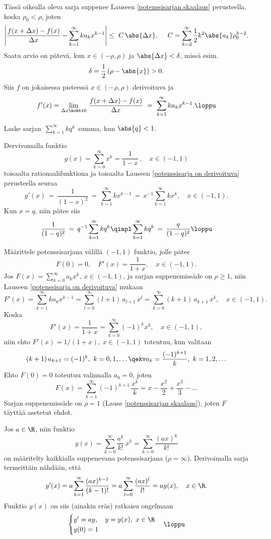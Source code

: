 Tässä oikealla oleva sarja suppenee Lauseen \ref{potenssisarjan skaalaus} perusteella, koska
$\rho_0<\rho$, joten
\[
\left|\frac{f(x+\Delta x)-f(x)}{\Delta x} - \sum_{k=1}^\infty ka_kx^{k-1}\right| 
       \le\ C\,\abs{\Delta x}, \quad\ C = \sum_{k=2}^\infty \frac{1}{2}k^2\abs{a_k}\rho_0^{k-2}.
\]
Saatu arvio on pätevä, kun $x \in (-\rho,\rho)$ ja $\abs{\Delta x} < \delta$, missä esim.\ 
\[ 
\delta = \frac{1}{2}\,(\rho-\abs{x}) > 0. 
\]
Siis $f$ on jokaisessa pisteessä $x \in (-\rho,\rho)$ derivoituva ja
\[
f'(x) = \lim_{\Delta x \kohti 0}\,\frac{f(x+\Delta x)-f(x)}{\Delta x}\ 
      =\ \sum_{k=1}^\infty ka_kx^{k-1}. \loppu
\]
\begin{Exa} Laske sarjan $\,\sum_{k=1}^\infty k q^k\,$ summa, kun $\abs{q}<1$. \end{Exa}
\ratk Dervivomalla funktio
\[ 
g(x) = \sum_{k=0}^\infty x^k = \frac{1}{1-x}\,, \quad x \in (-1,1) 
\]
toisaalta rationaalifunktiona ja toisaalta Lauseen \ref{potenssisarja on derivoituva} 
perusteella seuraa
\[ 
g'(x) \,=\, \frac{1}{(1-x)^2} \,=\, \sum_{k=1}^\infty kx^{k-1} 
                              \,=\, x^{-1}\sum_{k=1}^\infty kx^k, \quad x \in (-1,1). 
\]
Kun $x=q$, niin pätee siis
\[
\frac{1}{(1-q)^2} \,=\, q^{-1}\sum_{k=1}^\infty kq^k 
                  \qimpl \sum_{k=1}^\infty kq^k \,=\, \frac{q}{(1-q)^2} \loppu
\]
\begin{Exa} Määrittele potenssisarjana välillä $(-1,1)$ funktio, jolle pätee
\[
F(0)=0, \quad F'(x) = \frac{1}{1+x}, \quad x \in (-1,1).
\]
\ratk Jos $F(x)=\sum_{k=0}^\infty a_k x^k,\ x \in (-1,1)$, ja sarjan suppenemissäde on
$\rho \ge 1$, niin Lauseen \ref{potenssisarja on derivoituva} mukaan
\[
F'(x) = \sum_{k=1}^\infty ka_k x^{k-1} 
      = \sum_{l=0}^\infty (l+1)\,a_{l+1}\,x^l 
      = \sum_{k=0}^\infty (k+1)\,a_{k+1}\,x^k, \quad x \in (-1,1).
\]
Koska 
\[
F'(x) = \frac{1}{1+x} = \sum_{k=0}^\infty (-1)^k x^k, \quad x \in (-1,1),
\]
niin ehto $F'(x)=1/(1+x),\ x \in (-1,1)$ toteutuu, kun valitaan 
\[
(k+1)\,a_{k+1}=(-1)^k,\ k=0,1,\ldots \qekv a_k = \frac{(-1)^{k+1}}{k},\ k=1,2,\ldots
\]
Ehto $F(0)=0$ toteutuu valinnalla $a_0=0$, joten
\[
F(x) = \sum_{k=1}^\infty (-1)^{k+1}\,\frac{x^k}{k} = x - \frac{x^2}{2} + \frac{x^3}{3} - \ldots
\]
Sarjan suppenemissäde on $\rho=1$ (Lause \ref{potenssisarjan skaalaus}), joten $F$ täyttää
asetetut ehdot. \loppu
\end{Exa}
\begin{Exa} Jos $a \in \R$, niin funktio
\[
y(x) = \sum_{k=0}^\infty \frac{a^k}{k!}\,x^k = \sum_{k=0}^\infty \frac{(ax)^k}{k!}
\]
on määritelty kaikkialla suppenevana potenssisarjana ($\rho=\infty$). Derivoimalla sarja
termeittäin nähdään, että
\[
y'(x) = a \sum_{k=1}^\infty \frac{(ax)^{k-1}}{(k-1)!} 
      = a \sum_{l=0}^\infty \frac{(ax)^l}{l!} = ay(x), \quad x\in\R.
\]
Funktio $y(x)$ on siis (ainakin eräs) ratkaisu ongelmaan
\[ 
\begin{cases} y'=ay, \quad y=y(x),\ x\in\R \\ y(0)=1 \end{cases} \loppu
\]
\end{Exa}

